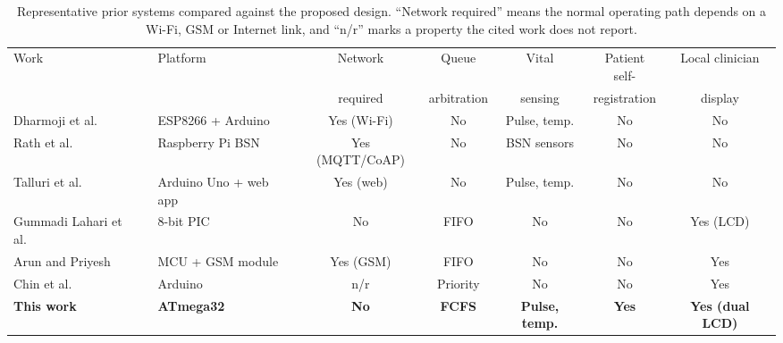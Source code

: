 \begin{table}[t]
  \caption{Representative prior systems compared against the proposed design.
    ``Network required'' means the normal operating path depends on a Wi-Fi, GSM
    or Internet link, and ``n/r'' marks a property the cited work does not
    report.}
  \label{tab:comparison}
  \footnotesize
  \begin{tabular}{@{}llccccc@{}}
    \toprule
    Work & Platform & Network & Queue & Vital & Patient self- & Local clinician \\
         &          & required & arbitration & sensing & registration & display \\
    \midrule
    Dharmoji et al.~\cite{irjet2020}        & ESP8266 + Arduino        & Yes (Wi-Fi)  & No           & Pulse, temp. & No  & No \\
    Rath et al.~\cite{rath2021}             & Raspberry Pi BSN         & Yes (MQTT/CoAP) & No        & BSN sensors  & No  & No \\
    Talluri et al.~\cite{hrtemp2019}        & Arduino Uno + web app    & Yes (web)    & No           & Pulse, temp. & No  & No \\
    Gummadi Lahari et al.~\cite{eqc2022}    & 8-bit PIC                & No           & FIFO         & No           & No  & Yes (LCD) \\
    Arun and Priyesh~\cite{qgsm2013}        & MCU + GSM module         & Yes (GSM)    & FIFO         & No           & No  & Yes \\
    Chin et al.~\cite{arpn2019}             & Arduino                  & n/r          & Priority     & No           & No  & Yes \\
    \midrule
    \textbf{This work}                      & \textbf{ATmega32}        & \textbf{No}  & \textbf{FCFS} & \textbf{Pulse, temp.} & \textbf{Yes} & \textbf{Yes (dual LCD)} \\
    \bottomrule
  \end{tabular}
\end{table}
